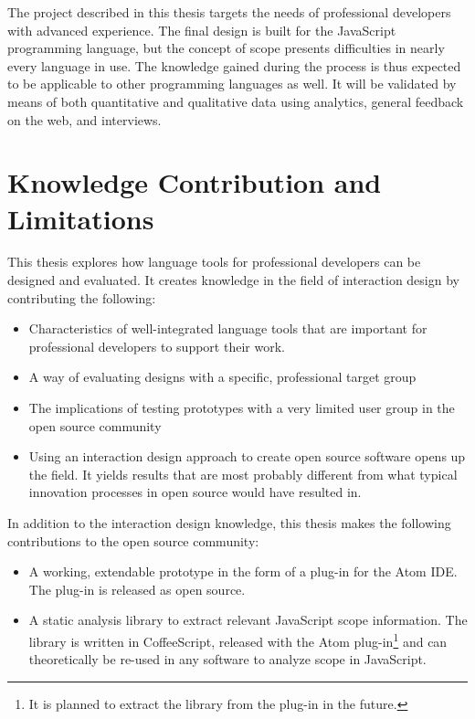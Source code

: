 The project described in this thesis targets the needs of professional
developers with advanced experience. The final design is built for the
JavaScript programming language, but the concept of scope presents
difficulties in nearly every language in use. The knowledge gained
during the process is thus expected to be applicable to other
programming languages as well. It will be validated by means of both
quantitative and qualitative data using analytics, general feedback on
the web, and interviews.

\section{Knowledge Contribution and
Limitations}\label{knowledge-contribution-and-limitations}

This thesis explores how language tools for professional developers can
be designed and evaluated. It creates knowledge in the field of
interaction design by contributing the following:

\begin{itemize}
\itemsep1pt\parskip0pt
\item
  Characteristics of well-integrated language tools that are important
  for professional developers to support their work.
\item
  A way of evaluating designs with a specific, professional target group
\item
  The implications of testing prototypes with a very limited user group
  in the open source community
\item
  Using an interaction design approach to create open source software
  opens up the field. It yields results that are most probably different
  from what typical innovation processes in open source would have
  resulted in.
\end{itemize}

In addition to the interaction design knowledge, this thesis makes the
following contributions to the open source community:

\begin{itemize}
\itemsep1pt\parskip0pt
\item
  A working, extendable prototype in the form of a plug-in for the Atom
  IDE. The plug-in is released as open source.
\item
  A static analysis library to extract relevant JavaScript scope
  information. The library is written in CoffeeScript, released with the
  Atom
  plug-in\footnote{It is planned to extract the library from the plug-in in the future.}
  and can theoretically be re-used in any software to analyze scope in
  JavaScript.
\end{itemize}

